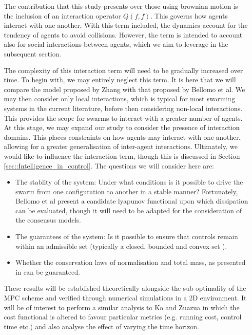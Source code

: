 \documentclass[.../main.tex]{subfiles}
\begin{document}
	The contribution that this study presents over those using brownian motion is the inclusion of an
	interaction operator $Q(f, f)$. This governs how agents interact with one another. With this
	term included, the dynamics account for the tendency of agents to avoid collisions. However,
	the term is intended to account also for social interactions between agents, which we aim to
	leverage in the subsequent section.

	The complexity of this interaction term will need to be gradually increased over time. To begin
	with, we may entirely neglect this term. It is here that we will compare the model proposed by Zhang
	with that proposed by Bellomo et al. We may then consider only local interactions, which is typical
	for most swarming systems in the current literature, before then considering non-local interactions.
	This provides the scope for swarms to interact with a greater number of agents. At this stage, we
	may expand our study to consider the presence of interaction domains. This places constraints on how
	agents may interact with one another, allowing for a greater generalisation of inter-agent
	interactions. Ultimately, we would like to influence the interaction term, though this is discussed
	in Section \ref{sec::Intelligence_in_control}. The questions we will
	consider here are:

	\begin{itemize}
		\item The stablity of the system: Under what conditions is it possible to drive the
		swarm from one configuration to another in a stable manner? Fortunately, Bellomo et al
		present a candidate lyapunov functional upon which dissipation can be evaluated, though it
		will need to be adapted for the consideration of the consensus models.
		\item The guarantees of the system: Is it possible to ensure that controls remain within an
		admissible set (typically a closed, bounded and convex set \cite{Fredi2010}).
		\item Whether the conservation laws of normalisation and total mass, as presented in 
		\cite{Bellomo2017} can be guaranteed.
	\end{itemize}

	These results will be established theoretically alongside the sub-optimality of the MPC scheme
	and verified through numerical simulations in a 2D environment. It
    will be of interest to perform a similar analysis to Ko and Zuazua \cite{Ko2019} in which the
    cost functional is altered to favour particular metrics  (e.g. running cost, control time etc.)
    and also analyse the effect of varying the time horizon.
\end{document}
